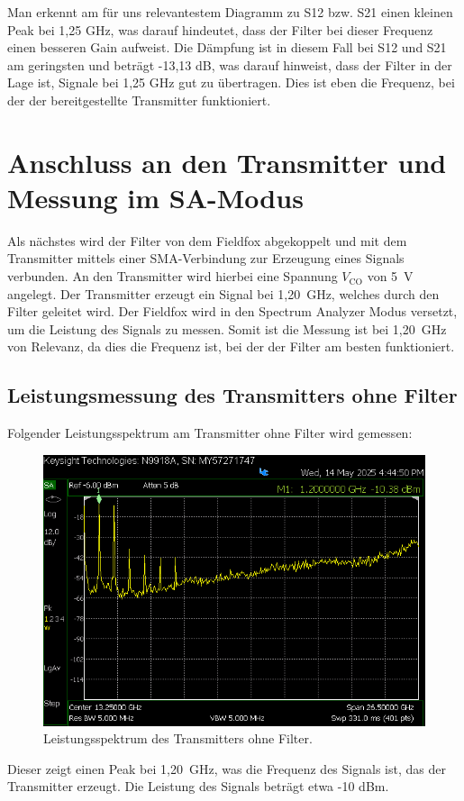     Man erkennt am für uns relevantestem Diagramm zu S12 bzw. S21 einen kleinen Peak bei 1,25 GHz, was darauf hindeutet, dass der Filter bei dieser Frequenz einen besseren Gain aufweist. Die Dämpfung ist in diesem Fall bei S12 und S21 am geringsten und beträgt -13,13 dB, was darauf hinweist, dass der Filter in der Lage ist, Signale bei 1,25 GHz gut zu übertragen.
    Dies ist eben die Frequenz, bei der der bereitgestellte Transmitter funktioniert.
\section{Anschluss an den Transmitter und Messung im SA-Modus}
    Als nächstes wird der Filter von dem Fieldfox abgekoppelt und mit dem Transmitter mittels einer SMA-Verbindung zur Erzeugung eines Signals verbunden. An den Transmitter wird hierbei eine Spannung $V_\mathrm{CO}$ von 5~V angelegt.
    Der Transmitter erzeugt ein Signal bei 1,20~GHz, welches durch den Filter geleitet wird. Der Fieldfox wird in den Spectrum Analyzer Modus versetzt, um die Leistung des Signals zu messen. 
    Somit ist die Messung ist bei 1,20~GHz von Relevanz, da dies die Frequenz ist, bei der der Filter am besten funktioniert.

    \subsection{Leistungsmessung des Transmitters ohne Filter}
    Folgender Leistungsspektrum am Transmitter ohne Filter wird gemessen:
    \begin{figure}[H]
        \centering
        \includegraphics[width=0.6\linewidth]{Pictures/SA-TranceiverohnegutFIlterPeakCooleGrupp.png}
        \caption{Leistungsspektrum des Transmitters ohne Filter.}
        \label{fig:transmitter_spectrum_without_filter}
    \end{figure}
    Dieser zeigt einen Peak bei 1,20~GHz, was die Frequenz des Signals ist, das der Transmitter erzeugt. Die Leistung des Signals beträgt etwa -10 dBm.
